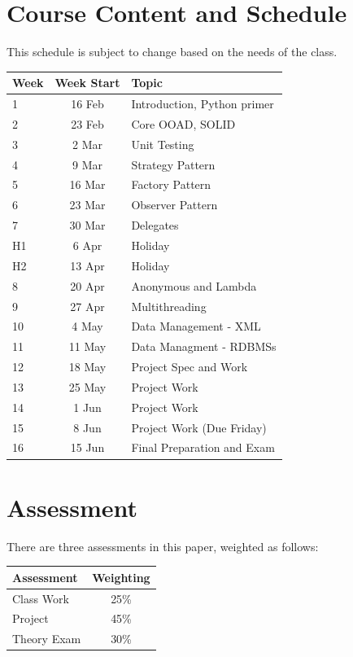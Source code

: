 \documentclass{article}
\begin{document}
\section*{Course Content and Schedule}
This schedule is subject to change based on the needs of the class.

\renewcommand{\arraystretch}{1.5}
\begin{tabular}{|l|c|l|}
\hline
 Week & Week Start & Topic                         \\ \hline
 1    & 16 Feb     & Introduction, Python primer \\ \hline
 2    & 23 Feb     & Core OOAD, SOLID  \\ \hline
 3    &  2 Mar     & Unit Testing   \\ \hline
 4    &  9 Mar     & Strategy Pattern    \\ \hline
 5    & 16 Mar     & Factory Pattern   \\ \hline
 6    & 23 Mar     & Observer Pattern     \\ \hline
 7    & 30 Mar     & Delegates   \\ \hline
 H1   &  6 Apr     & Holiday             \\ \hline
 H2   & 13 Apr     & Holiday             \\ \hline
 8    & 20 Apr     & Anonymous and Lambda   \\ \hline
 9    & 27 Apr     & Multithreading        \\ \hline
 10   &  4 May     & Data Management - XML \\ \hline
 11   & 11 May     & Data Managment - RDBMSs  \\ \hline
 12   & 18 May     & Project Spec and Work \\ \hline
 13   & 25 May     & Project Work   \\ \hline
 14   &  1 Jun     & Project Work   \\ \hline
15   &  8 Jun     & Project Work  (Due Friday)  \\ \hline
 16   & 15 Jun     & Final Preparation and Exam \\ \hline
\end{tabular}

\newpage

\section*{Assessment}
There are three assessments in this paper, weighted as follows:


\begin{tabular}{|l|c|}
\hline
Assessment &  Weighting \\ \hline
 Class Work & 25\% \\ \hline
 Project & 45\% \\ \hline
 Theory Exam & 30\% \\ \hline
\end{tabular}
\end{document}
